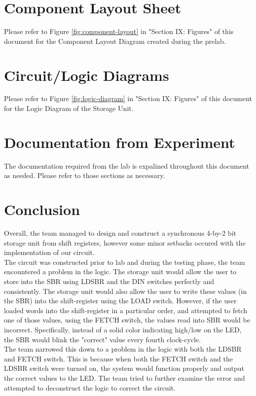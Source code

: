 \documentclass[journal, twocolumn, final,11pt,letterpaper]{IEEEtran}
\begin{document}
\section{Component Layout Sheet}
Please refer to Figure \ref{fig:component-layout} in "Section IX: Figures" of this document for the Component Layout Diagram created during the prelab.

\section{Circuit/Logic Diagrams}
Please refer to Figure \ref{fig:logic-diagram} in "Section IX: Figures" of this document for the Logic Diagram of the Storage Unit.  

\vspace{-2mm}
\section{Documentation from Experiment}
The documentation required from the lab is expalined throughout this document as needed. Please refer to those sections as necessary. 

\section{Conclusion}
Overall, the team managed to design and construct a synchronous 4-by-2 bit storage unit from shift registers, however some minor setbacks occured with the implementation of our circuit.\\ 

The circuit was constructed prior to lab and during the testing phase, the team encountered a problem in the logic. The storage unit would allow the user to store into the SBR using LDSBR and the DIN switches perfectly and consistently. The storage unit would also allow the user to write these values (in the SBR) into the shift-register using the LOAD switch. However, if the user loaded words into the shift-register in a particular order, and attempted to fetch one of those values, using the FETCH switch, the values read into SBR would be incorrect. Specifically, instead of a solid color indicating high/low on the LED, the SBR would blink the "correct" value every fourth clock-cycle. \\

The team narrowed this down to a problem in the logic with both the LDSBR and FETCH switch. This is because when both the FETCH switch and the LDSBR switch were turned on, the system would function properly and output the correct values to the LED. The team tried to further examine the error and attempted to deconstruct the logic to correct the circuit. \\
\end{document}
